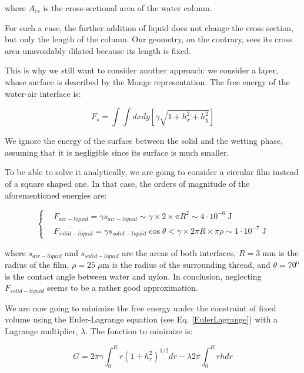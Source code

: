where $A_{cs}$ is the cross-sectional area of the water column.

For such a case, the further addition of liquid does not change the cross section, but only the length of the column. Our geometry, on the contrary, sees its cross area unavoidably dilated because its length is fixed.

This is why we still want to consider another approach: we consider a layer, whose surface is described by the Monge representation. The free energy of the water-air interface is:

\begin{equation}
F_{s}=\int \int d x d y\left[\gamma \sqrt{1+h_{x}^{2}+h_{y}^{2}}\right]
\end{equation}
 
We ignore the energy of the surface between the solid and the wetting phase, assuming that it is negligible since its surface is much smaller. 

To be able to solve it analytically, we are going to consider a circular film instead of a square shaped one. In that case, the orders of magnitude of the aforementioned energies are: 

\begin{equation}
\left\{
\begin{aligned} & F_{air-liquid} = \gamma s_{air-liquid} \sim \gamma \times 2 \times \pi R^2 \sim 4 \cdot 10^{-6} \; \textrm{J} \\
& F_{solid-liquid} = \gamma s_{solid-liquid} \cos \theta  < \gamma \times 2 \pi R \times \pi \rho \sim 1 \cdot 10^{-7} \; \textrm{J}
\end{aligned}
\right.
\end{equation}

where $s_{air-liquid}$ and $s_{solid-liquid}$ are the areas of both interfaces, $R = 3 \; \textrm{mm}$ is the radius of the film, $\rho = 25 \; \mu \textrm{m}$ is the radius of the surrounding thread, and $\theta = 70^\textrm{o}$ is the contact angle between water and nylon. In conclusion, neglecting $F_{solid-liquid}$ seems to be a rather good approximation.

We are now going to minimize the free energy under the constraint of fixed volume using the Euler-Lagrange equation (see Eq. \ref{EulerLagrange}) with a Lagrange multiplier, $\lambda$. The function to minimize is:

\begin{equation}
G=2 \pi \gamma \int_{0}^{R} r\left(1+h_r^{2}\right)^{1 / 2} d r-\lambda 2 \pi \int_{0}^{R} r h d r
\end{equation}

